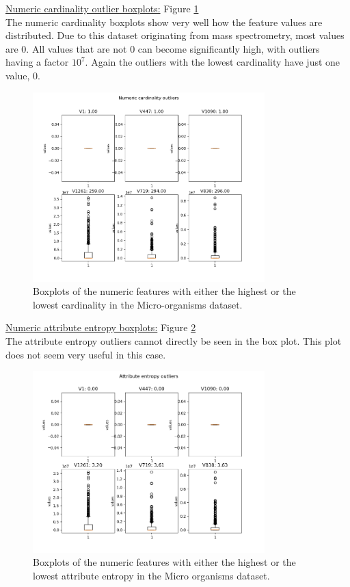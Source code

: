 \documentclass[10pt,a4paper]{report}
\begin{document}
\begin{itemize}
		\underline{Numeric cardinality outlier boxplots:} Figure \ref{fig:MOCardNum} \\
		
		The numeric cardinality boxplots show very well how the feature values are distributed. Due to this dataset originating from mass spectrometry, most values are 0. All values that are not 0 can become significantly high, with outliers having a factor $10^7$. Again the outliers with the lowest cardinality have just one value, 0.
		
		\begin{figure}[]
			\centering
			\includegraphics[width=0.8\textwidth]{MO_Card_Num.png}
			\caption{Boxplots of the numeric features with either the highest or the lowest cardinality in the Micro-organisms dataset.}
			\label{fig:MOCardNum}
		\end{figure}
		
		\underline{Numeric attribute entropy boxplots:} Figure \ref{fig:MOAttEntNum} \\
		
		The attribute entropy outliers cannot directly be seen in the box plot. This plot does not seem very useful in this case.
		
		\begin{figure}[]
			\centering
			\includegraphics[width=0.8\textwidth]{MO_AttEnt_Num.png}
			\caption{Boxplots of the numeric features with either the highest or the lowest attribute entropy in the Micro organisms dataset.}
			\label{fig:MOAttEntNum}
		\end{figure}
		
	\end{itemize}	
	
\end{document}
